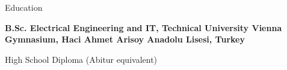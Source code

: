 \begin{rubric}{Education}

%
	\textbf{B.Sc. Electrical Engineering and IT, Technical University Vienna}
% 
\vspace{4px}
%
	\textbf{Gymnasium, Haci Ahmet Arisoy Anadolu Lisesi, Turkey}
 
    
	\par High School Diploma (Abitur equivalent)
 
    
\end{rubric}